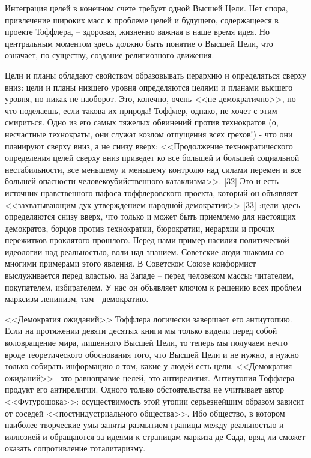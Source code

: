 \documentclass{book}
\begin{document}
Интеграция целей в конечном счете требует одной Высшей Цели. Нет спора, привлечение широких масс к проблеме целей и будущего, содержащееся в проекте Тоффлера, -- здоровая, жизненно важная в наше время идея. Но центральным момен­том здесь должно быть понятие о Высшей Цели, что означает, по существу, создание религиозного движения.

Цели и планы обладают свойством образовывать иерархию и определяться сверху вниз: цели и планы низшего уровня определяются целями и планами высшего уровня, но никак не наоборот. Это, конечно, очень <<не демократично>>, но что поде­лаешь, если такова их природа! Тоффлер, однако, не хочет с этим смириться. Одно из его самых тяжелых обвинений против технократов (о, несчастные технократы, они служат козлом отпущения всех грехов!) - что они планируют сверху вниз, а не снизу вверх: <<Продолжение технократического определения целей сверху вниз приведет ко все большей и большей социаль­ной нестабильности, все меньшему и меньшему контролю над си­лами перемен и все большей опасности человекоубийственного катаклизма>>. [32] Это и есть источник нравственного пафоса тоффлеровского проекта, который он объявляет <<захватыва­ющим дух утверждением народной демократии>> [33] :цели здесь определяются снизу вверх, что только и может быть приемлемо для настоящих демократов, борцов против технократии, бю­рократии, иерархии и прочих 
пережитков проклятого прошлого. Перед нами пример насилия политической идеологии над реаль­ностью, воли над знанием. Советские люди знакомы со многи­ми примерами этого явления. В Советском Союзе конформист выслуживается перед властью, на Западе -- перед человеком мас­сы: читателем, покупателем, избирателем. У нас он объявляет ключом к решению всех проблем марксизм-ленинизм, там - демократию.

<<Демократия ожиданий>> Тоффлера логически завершает его антиутопию. Если на протяжении девяти десятых книги мы только видели перед собой коловращение мира, лишенного Высшей Цели, то теперь мы получаем нечто вроде теоретиче­ского обоснования того, что Высшей Цели и не нужно, а нужно только собирать информацию о том, какие у людей есть  цели. <<Демократия ожиданий>> --это равноправие целей, это анти­религия. Антиутопия Тоффлера -- продукт его антирелигии. Одного только обстоятельства не учитывает автор <<Футурошока>>: осуществимость этой утопии серьезнейшим образом за­висит от соседей <<постиндустриального общества>>. Ибо общест­во, в котором наиболее творческие умы заняты размытием гра­ницы между реальностью и иллюзией и обращаются за идеями к страницам маркиза де Сада, вряд ли сможет оказать сопротив­ление тоталитаризму.
\end{document}
